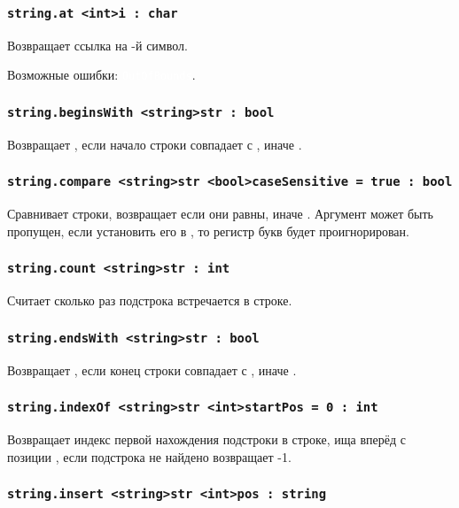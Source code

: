 \documentclass[a4paper, 14pt]{extarticle}
\newcommand{\ferror}[1]{{\fontsize{11pt}{12pt} \tt \colorbox{function}{\textcolor{white}{#1}}}}
\begin{document}
\subsubsection{\lstinline|string.at <int>i : char|}

Возвращает ссылка на -й символ.

Возможные ошибки: \ferror{OutOfBounds}.

\subsubsection{\lstinline|string.beginsWith <string>str : bool|}

Возвращает \true{}, если начало строки совпадает с , иначе \false{}.

\subsubsection{\lstinline|string.compare <string>str <bool>caseSensitive = true : bool|}

Сравнивает строки, возвращает \true{} если они равны, иначе \false{}. Аргумент  может быть пропущен, если установить его в \false{}, то регистр букв будет проигнорирован.

\subsubsection{\lstinline|string.count <string>str : int|}

Считает сколько раз подстрока  встречается в строке.

\subsubsection{\lstinline|string.endsWith <string>str : bool|}

Возвращает \true{}, если конец строки совпадает с , иначе \false{}.

\subsubsection{\lstinline|string.indexOf <string>str <int>startPos = 0 : int|}

Возвращает индекс первой нахождения подстроки  в строке, ища вперёд с позиции , если подстрока не найдено возвращает -1.

\subsubsection{\lstinline|string.insert <string>str <int>pos : string|}
\end{document}
